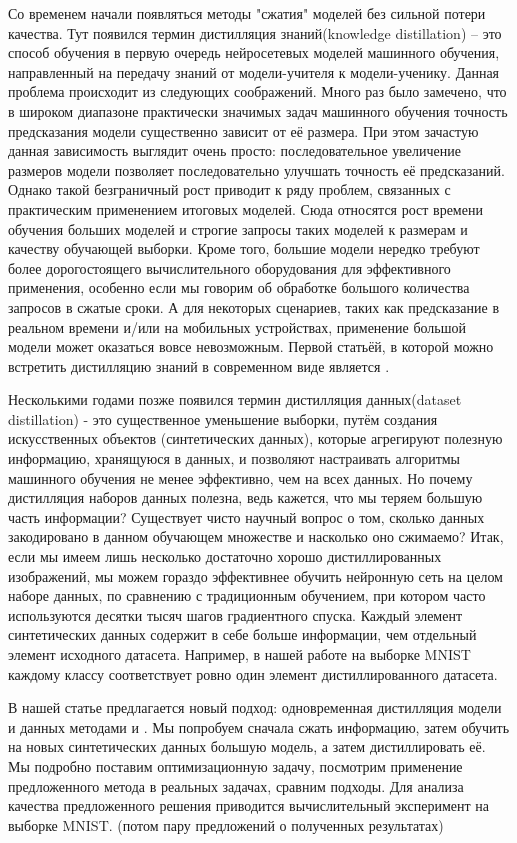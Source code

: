 \documentclass[12pt]{article}
\begin{document}
Со временем начали появляться методы "сжатия" моделей без сильной потери качества. Тут появился термин дистилляция знаний(knowledge distillation) – это способ обучения в первую очередь нейросетевых моделей машинного обучения, направленный на передачу знаний от модели-учителя к модели-ученику. Данная проблема происходит из следующих соображений. Много раз было замечено, что в широком диапазоне практически значимых задач машинного обучения точность предсказания модели существенно зависит от её размера. При этом зачастую данная зависимость выглядит очень просто: последовательное увеличение размеров модели позволяет последовательно улучшать точность её предсказаний. Однако такой безграничный рост приводит к ряду проблем, связанных с практическим применением итоговых моделей. Сюда относятся рост времени обучения больших моделей и строгие запросы таких моделей к размерам и качеству обучающей выборки. Кроме того, большие модели нередко требуют более дорогостоящего вычислительного оборудования для эффективного применения, особенно если мы говорим об обработке большого количества запросов в сжатые сроки. А для некоторых сценариев, таких как предсказание в реальном времени и/или на мобильных устройствах, применение большой модели может оказаться вовсе невозможным. Первой статьёй, в которой можно встретить дистилляцию знаний в современном виде является \cite{hinton2015distilling}.

Несколькими годами позже появился термин дистилляция данных(dataset distillation) - это существенное уменьшение выборки, путём создания искусственных объектов (синтетических данных), которые агрегируют полезную информацию, хранящуюся в данных, и позволяют настраивать алгоритмы машинного обучения не менее эффективно, чем на всех данных. Но почему дистилляция наборов данных полезна, ведь кажется, что мы теряем большую часть информации? Существует чисто научный вопрос о том, сколько данных
закодировано в данном обучающем множестве и насколько оно сжимаемо? 
Итак, если мы имеем лишь несколько достаточно хорошо дистиллированных изображений, мы можем гораздо эффективнее обучить нейронную сеть на целом наборе данных,
по сравнению с традиционным обучением, при котором часто используются десятки тысяч шагов градиентного спуска. Каждый элемент синтетических данных содержит в себе больше информации, чем отдельный элемент исходного датасета. Например, в нашей работе на выборке MNIST каждому классу соответствует ровно один элемент дистиллированного датасета.

В нашей статье предлагается новый подход: одновременная дистилляция модели и данных методами \cite{hinton2015distilling} и \cite{cazenavette2022dataset}. Мы попробуем сначала сжать информацию, затем обучить на новых синтетических данных большую модель, а затем дистиллировать её. Мы подробно поставим оптимизационную задачу, посмотрим применение предложенного метода в реальных задачах, сравним подходы. Для анализа качества предложенного решения приводится вычислительный эксперимент на выборке MNIST. (потом пару предложений о полученных результатах) 
\end{document}
